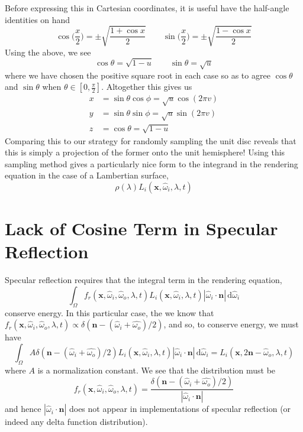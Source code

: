 \documentclass{article}
\begin{document}
Before expressing this in Cartesian coordinates, it is useful have the half-angle identities on hand
\[
	\cos\Big(\frac{x}{2}\Big) = \pm\sqrt{\frac{1 + \cos x}{2}} \qquad \sin\Big(\frac{x}{2}\Big) = \pm\sqrt{\frac{1 - \cos x}{2}}
\]
Using the above, we see
\[
	\cos\theta = \sqrt{1 - u} \qquad \sin\theta = \sqrt{u}
\]
where we have chosen the positive square root in each case so as to agree $\cos\theta$ and $\sin\theta$ when $\theta \in [0, \tfrac{\pi}{2}]$. Altogether this gives us
\begin{align*}
	x &= \sin\theta\cos\phi = \sqrt{u}\cos(2\pi v) \\
	y &= \sin\theta\sin\phi = \sqrt{u}\sin(2\pi v) \\
	z &= \cos\theta = \sqrt{1 - u}
\end{align*}
Comparing this to our strategy for randomly sampling the unit disc reveals that this is simply a projection of the former onto the unit hemisphere! Using this sampling method gives a particularly nice form to the integrand in the rendering equation in the case of a Lambertian surface,
\[
	\rho(\lambda)L_i(\mathbf{x}, \hat{\omega}_i, \lambda, t)
\]

\section*{Lack of Cosine Term in Specular Reflection}

Specular reflection requires that the integral term in the rendering equation,
\[
	\int_\Omega f_r(\mathbf{x}, \hat{\omega}_i, \hat{\omega}_o, \lambda, t)L_i(\mathbf{x}, \hat{\omega}_i, \lambda, t)|\hat{\omega}_i\cdot\mathbf{n}|\,\mathrm{d}\hat{\omega}_i
\]
conserve energy. In this particular case, the we know that $f_r(\mathbf{x}, \hat{\omega}_i, \hat{\omega}_o, \lambda, t) \propto \delta(\mathbf{n} - (\hat{\omega}_i + \hat{\omega_o})/2)$, and so, to conserve energy, we must have
\[
	\int_\Omega A\delta(\mathbf{n} - (\hat{\omega}_i + \hat{\omega_o})/2)L_i(\mathbf{x}, \hat{\omega}_i, \lambda, t)|\hat{\omega}_i\cdot\mathbf{n}|\,\mathrm{d}\hat{\omega}_i = L_i(\mathbf{x}, 2\mathbf{n} - \hat{\omega}_o, \lambda, t)
\]
where $A$ is a normalization constant. We see that the distribution must be
\[
	f_r(\mathbf{x}, \hat{\omega}_i, \hat{\omega}_o, \lambda, t) = \frac{\delta(\mathbf{n} - (\hat{\omega}_i + \hat{\omega_o})/2)}{|\hat{\omega}_i\cdot\mathbf{n}|}
\]
and hence $|\hat{\omega}_i\cdot\mathbf{n}|$ does not appear in implementations of specular reflection (or indeed any delta function distribution).
\end{document}
